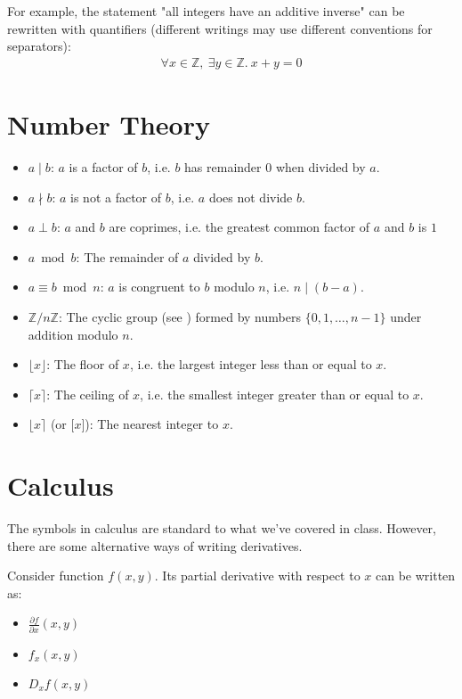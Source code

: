 \documentclass[12pt]{article}
\theoremstyle{definition}
\newcommand{\bras}[1]{\lbrace #1 \rbrace}
\begin{document}
  	For example, the statement "all integers have an additive inverse" can be rewritten with quantifiers (different writings may use different conventions for separators):
  	\begin{gather*}
  		\forall x \in \mathbb{Z},\ \exists y \in \mathbb{Z}.\ x + y = 0
  	\end{gather*}
 	
 	\section{Number Theory}
 	
 	\begin{itemize}
 		\item $a \mid b$: $a$ is a factor of $b$, i.e. $b$ has remainder $0$ when divided by $a$.
 		\item $a \nmid b$: $a$ is not a factor of $b$, i.e. $a$ does not divide $b$.
 		\item $a \perp b$: $a$ and $b$ are coprimes, i.e. the greatest common factor of $a$ and $b$ is $1$
 		\item $a \bmod b$: The remainder of $a$ divided by $b$.
 		\item $a \equiv b \bmod n$: $a$ is congruent to $b$ modulo $n$, i.e. $n \mid (b - a)$.
 		\item $\mathbb{Z}/n\mathbb{Z}$: The cyclic group (see ) formed by numbers $\bras{0, 1, \dots, n - 1}$ under addition modulo $n$.
 		\item $\lfloor x \rfloor$: The floor of $x$, i.e. the largest integer less than or equal to $x$.
 		\item $\lceil x \rceil$: The ceiling of $x$, i.e. the smallest integer greater than or equal to $x$.
 		\item $\lfloor x \rceil$ (or $\lbrack x \rbrack$): The nearest integer to $x$.
 	\end{itemize}
 	
 	\section{Calculus}
 	
 	The symbols in calculus are standard to what we've covered in class. However, there are some alternative ways of writing derivatives.
 	
 	Consider function $f(x, y)$. Its partial derivative with respect to $x$ can be written as:
 	\begin{itemize}
 		\item $\frac{\partial f}{\partial x}(x, y)$
 		\item $f_x(x, y)$
 		\item $D_xf(x, y)$
 	\end{itemize}
 	
\end{document}
